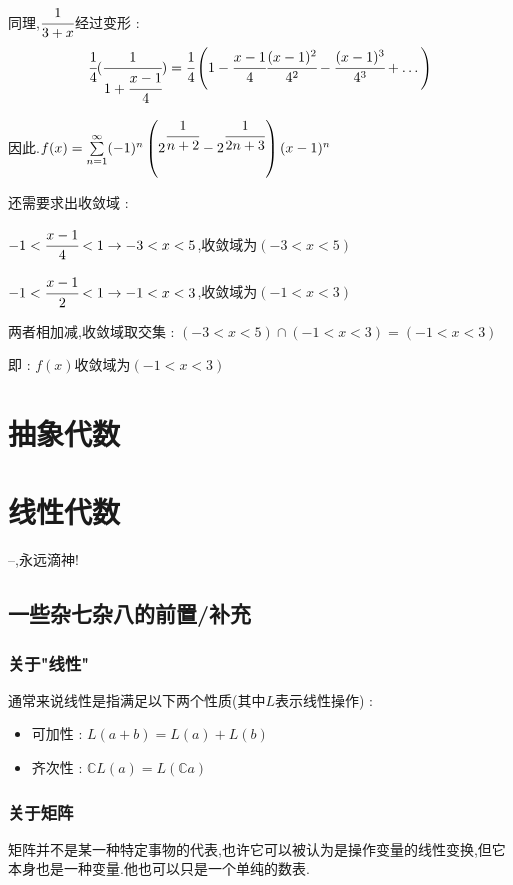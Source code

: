 \documentclass[UTF8,12pt]{ctexbook}
\newcommand{\upDownSum}[2]{\sum\limits_{#2}^{#1}}
\newcommand{\defFunction}[1]{f(#1)}
\newcommand{\mathConstant}{\mathbb{C}}
\newcommand{\bigCase}[1]{\left(#1\right)}
\newcommand{\sumSeries}{\upDownSum{\infty}{n = 1}}
\begin{document}
{{{{{\begin{enumerate}
{            同理,$\cfrac{1}{3 + x}$经过变形 :
            $$
              \cfrac{1}{4}(\cfrac{1}{1 + \cfrac{x - 1}{4}}) = \cfrac{1}{4}\bigCase{1 - \cfrac{x - 1}{4} \cfrac{(x - 1)^2}{4^2} - \cfrac{(x - 1)^3}{4^3} + \dots}
            $$

            因此.$\defFunction{x} = \sumSeries(-1)^n\bigCase{2^{\cfrac{1}{n + 2}} - 2^{\cfrac{1}{2n + 3}}}(x - 1)^n$

            还需要求出收敛域 :

            $-1 < \cfrac{x - 1}{4} < 1 \to -3 < x < 5$,收敛域为$(-3 < x < 5)$

            $-1 < \cfrac{x - 1}{2} < 1 \to -1 < x < 3$,收敛域为$(-1 < x < 3)$

            两者相加减,收敛域取交集 : $(-3 < x < 5) \cap (-1 < x < 3) = (-1 < x < 3)$

            即 : $\defFunction{x}$收敛域为$(-1 < x < 3)$
            }
    \end{enumerate}
  }%

}%

}%

\section{抽象代数}{}%

\section{线性代数}{
--{,永远滴神!}

\subsection{一些杂七杂八的前置/补充}{

  \subsubsection{关于"线性"}{
    通常来说线性是指满足以下两个性质(其中$L$表示线性操作) :
    \begin{itemize}
      \item 可加性 : $L(a + b) = L(a) + L(b)$
      \item 齐次性 : $\mathConstant L(a) = L(\mathConstant a)$
    \end{itemize}
  }%

  \subsubsection{关于矩阵}{
    矩阵并不是某一种特定事物的代表,也许它可以被认为是操作变量的线性变换,但它本身也是一种变量.他也可以只是一个单纯的数表.

}}}}}
\end{document}
